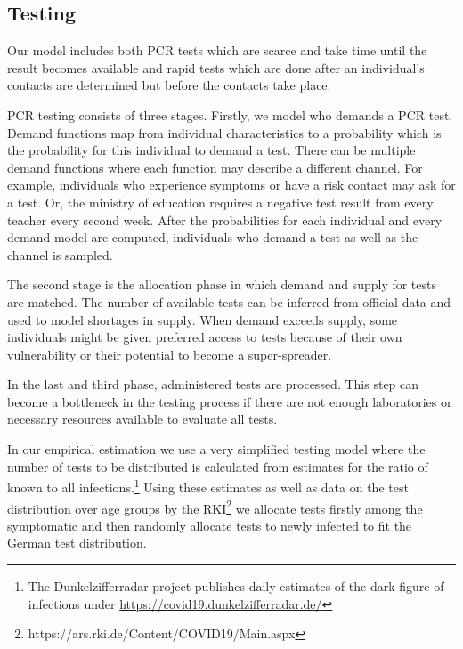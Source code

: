 \subsection{Testing} %
\label{sub:testing}

Our model includes both PCR tests which are scarce and take time until the result becomes
available and rapid tests which are done after an individual's contacts are determined
but before the contacts take place.

PCR testing consists of three stages. Firstly, we model who demands a PCR test. Demand
functions map from individual characteristics to a probability which is the probability
for this individual to demand a test. There can be multiple demand functions where each
function may describe a different channel. For example, individuals who experience
symptoms or have a risk contact may ask for a test. Or, the ministry of education
requires a negative test result from every teacher every second week. After the
probabilities for each individual and every demand model are computed, individuals who
demand a test as well as the channel is sampled.

The second stage is the allocation phase in which demand and supply for tests are
matched. The number of available tests can be inferred from official data and used to
model shortages in supply. When demand exceeds supply, some individuals might be given
preferred access to tests because of their own vulnerability or their potential to
become a super-spreader.

In the last and third phase, administered tests are processed. This step can become a
bottleneck in the testing process if there are not enough laboratories or necessary
resources available to evaluate all tests.

In our empirical estimation we use a very simplified testing model where the number of
tests to be distributed is calculated from estimates for the ratio of known to all
infections.\footnote{The Dunkelzifferradar project publishes daily estimates of the dark
    figure of infections under \url{https://covid19.dunkelzifferradar.de/}} Using these
estimates as well as data on the test distribution over age groups by the
RKI\footnote{https://ars.rki.de/Content/COVID19/Main.aspx} we allocate tests firstly
among the symptomatic and then randomly allocate tests to newly infected to fit the
German test distribution.



